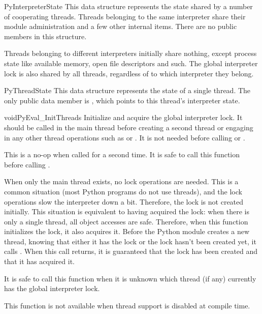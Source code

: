 \begin{ctypedesc}{PyInterpreterState}
  This data structure represents the state shared by a number of
  cooperating threads.  Threads belonging to the same interpreter
  share their module administration and a few other internal items.
  There are no public members in this structure.

  Threads belonging to different interpreters initially share nothing,
  except process state like available memory, open file descriptors
  and such.  The global interpreter lock is also shared by all
  threads, regardless of to which interpreter they belong.
\end{ctypedesc}

\begin{ctypedesc}{PyThreadState}
  This data structure represents the state of a single thread.  The
  only public data member is , which points to this thread's interpreter state.
\end{ctypedesc}

\begin{cfuncdesc}{void}{PyEval_InitThreads}{}
  Initialize and acquire the global interpreter lock.  It should be
  called in the main thread before creating a second thread or
  engaging in any other thread operations such as
   or
  .
  It is not needed before calling
   or
  .

  This is a no-op when called for a second time.  It is safe to call
  this function before calling
  .

  When only the main thread exists, no lock operations are needed.
  This is a common situation (most Python programs do not use
  threads), and the lock operations slow the interpreter down a bit.
  Therefore, the lock is not created initially.  This situation is
  equivalent to having acquired the lock: when there is only a single
  thread, all object accesses are safe.  Therefore, when this function
  initializes the lock, it also acquires it.  Before the Python
   module creates a new thread,
  knowing that either it has the lock or the lock hasn't been created
  yet, it calls .  When this call
  returns, it is guaranteed that the lock has been created and that it
  has acquired it.

  It is  safe to call this function when it is unknown
  which thread (if any) currently has the global interpreter lock.

  This function is not available when thread support is disabled at
  compile time.
\end{cfuncdesc}


